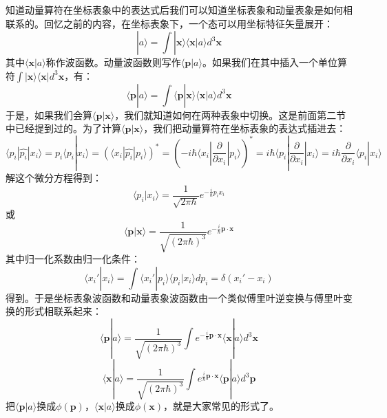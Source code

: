 \documentclass{ctexart}
\begin{document}
知道动量算符在坐标表象中的表达式后我们可以知道坐标表象和动量表象是如何相联系的。回忆之前的内容，在坐标表象下，一个态可以用坐标特征矢量展开：
\begin{equation}
|a\rangle=\int|\bm{x}\rangle\langle \bm{x}|a\rangle d^3\bm{x}
\end{equation}
其中$\langle\bm{x}|a\rangle$称作波函数。动量波函数则写作$\langle\bm{p}|a\rangle$。如果我们在其中插入一个单位算符$\int|\bm{x}\rangle\langle\bm{x}|d^3\bm{x}$，有：
\begin{equation}
\langle\bm{p}|a\rangle=\int\langle\bm{p}|\bm{x}\rangle\langle\bm{x}|a\rangle d^3\bm{x}
\end{equation}
于是，如果我们会算$\langle\bm{p}|\bm{x}\rangle$，我们就知道如何在两种表象中切换。这是前面第二节中已经提到过的。为了计算$\langle\bm{p}|\bm{x}\rangle$，我们把动量算符在坐标表象的表达式插进去：
\begin{equation}
\langle p_i|\hat{p_i}|x_i\rangle=p_i\langle p_i|x_i\rangle=(\langle x_i|\hat{p_i}|p_i\rangle)^*=\left(-i\hbar\langle x_i|\frac{\partial}{\partial x_i}|p_i\rangle\right)^*=i\hbar\langle p_i|\frac{\partial}{\partial x_i}|x_i\rangle=i\hbar\frac{\partial}{\partial x_i}\langle p_i|x_i\rangle
\end{equation}
解这个微分方程得到：
\begin{equation}
\langle p_i|x_i\rangle=\frac{1}{\sqrt{2\pi\hbar}}e^{-\frac{i}{\hbar}p_ix_i}
\end{equation}
或
\begin{equation}
\langle \bm{p}|\bm{x}\rangle=\frac{1}{\sqrt{(2\pi\hbar)^3}}e^{-\frac{i}{\hbar}\bm{p}\cdot\bm{x}}
\end{equation}
其中归一化系数由归一化条件：
\begin{equation}
\langle x_i'|x_i\rangle=\int\langle x_i'|p_i\rangle\langle p_i|x_i\rangle dp_i=\delta(x_i'-x_i)
\end{equation}
得到。于是坐标表象波函数和动量表象波函数由一个类似傅里叶逆变换与傅里叶变换的形式相联系起来：
\begin{equation}
\langle\bm{p}|a\rangle=\frac{1}{\sqrt{(2\pi\hbar)^3}}\int e^{-\frac{i}{\hbar}\bm{p}\cdot\bm{x}}\langle\bm{x}|a\rangle d^3\bm{x}
\end{equation}
\begin{equation}
\langle\bm{x}|a\rangle=\frac{1}{\sqrt{(2\pi\hbar)^3}}\int e^{\frac{i}{\hbar}\bm{p}\cdot\bm{x}}\langle\bm{p}|a\rangle d^3\bm{p}
\end{equation}
把$\langle \bm{p}|a\rangle$换成$\phi(\bm{p})$，$\langle \bm{x}|a\rangle$换成$\phi(\bm{x})$，就是大家常见的形式了。
\end{document}
